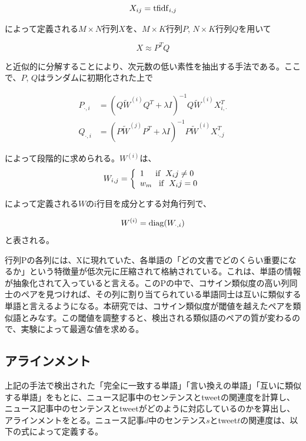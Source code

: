 \documentclass[12pt]{jarticle}
\begin{document}
\begin{equation}
  X_{ij} = {\rm tfidf}_{i,j}
\end{equation}

によって定義される$M \times N$行列$X$を、$M \times K$行列$P$, $N \times K$行列$Q$を用いて

\begin{equation}
  X \approx P^T Q
\end{equation}

と近似的に分解することにより、次元数の低い素性を抽出する手法である。ここで、$P$, $Q$はランダムに初期化された上で

\begin{align}
  P_{\cdot ,i} &= (Q\tilde W^{(i)}Q^T + \lambda I)^{-1} Q \tilde W^{(i)} X_{i, \cdot }^T \\
  Q_{\cdot ,i} &= (P\tilde W^{(j)}P^T + \lambda I)^{-1} P \tilde W^{(i)} X_{\cdot , j}^T
\end{align}

によって段階的に求められる。$W^{(i)}$は、
\begin{displaymath}
W_{i,j} = \left\{
\begin{array}{l}
1\;\;\;\;\;{\rm if} \;\; X_ij \neq 0 \\
w_m\;\;\;{\rm if} \;\; X_ij = 0
\end{array}
\right.
\end{displaymath}

によって定義される$W$のi行目を成分とする対角行列で、

\begin{equation}
  W^{(i)} = {\rm diag}(W_{\cdot, i})
\end{equation}
と表される。

行列Pの各列には、Xに現れていた、各単語の「どの文書でどのくらい重要になるか」という特徴量が低次元に圧縮されて格納されている。これは、単語の情報が抽象化されて入っていると言える。このPの中で、コサイン類似度の高い列同士のペアを見つければ、その列に割り当てられている単語同士は互いに類似する単語と言えるようになる。本研究では、コサイン類似度が閾値を越えたペアを類似語とみなす。この閾値を調整すると、検出される類似語のペアの質が変わるので、実験によって最適な値を求める。

\subsection{アラインメント}
上記の手法で検出された「完全に一致する単語」「言い換えの単語」「互いに類似する単語」をもとに、ニュース記事中のセンテンスとtweetの関連度を計算し、ニュース記事中のセンテンスとtweetがどのように対応しているのかを算出し、アラインメントをとる。ニュース記事$d$中のセンテンス$s$とtweet$t$の関連度は、以下の式によって定義する。
\end{document}
